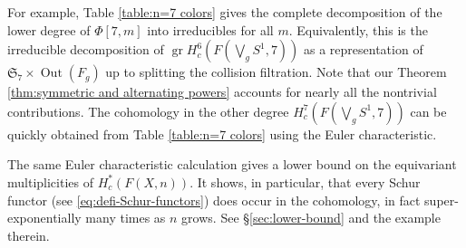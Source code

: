 \documentclass[12pt]{article}
\newcommand{\SymGroup}[1][n]{\mathfrak{S}_{#1}}
\DeclareMathOperator{\GL}{GL}
\DeclareMathOperator{\gr}{gr}
\DeclareMathOperator{\Out}{Out}
\theoremstyle{plain}
\theoremstyle{definition}
\theoremstyle{remark}
\begin{document}
\begin{table}[hbt!]
{\begin{minipage}{\textwidth}
\begin{tabular}
\end{tabular}
    \caption{$(\lambda,\mu)$ multiplicity in $\Phi[7,m]$ in codimension 1, arranged in lex-order of partitions. Unspecified entries are all zero. Yellow and red columns correspond to symmetric and alternating powers, respectively, and are completely described by Theorem \ref{thm:symmetric and alternating powers}. Lilac rows are computed in \cite[Examples 3-4]{PV18}. %
    }
    \label{table:n=7 colors}
    \end{minipage}}
\end{table}
For example, Table \ref{table:n=7 colors} gives the complete decomposition of the lower degree of $\Phi[7,m]$ into irreducibles for all $m$. Equivalently, this is the irreducible decomposition of $\gr H^{6}_c(F(\bigvee_g S^1 ,7))$ as a representation of $\SymGroup[7]\times \Out(F_g)$ up to splitting the collision filtration. Note that our Theorem \ref{thm:symmetric and alternating powers} accounts for nearly all the nontrivial contributions. The cohomology in the other degree $ H^{7}_c(F(\bigvee_g S^1 ,7))$ can be quickly obtained from Table \ref{table:n=7 colors} using the Euler characteristic.

The same Euler characteristic calculation gives a lower bound on the equivariant multiplicities of $H^*_c(F(X,n))$. It shows, in particular, that every Schur functor (see \eqref{eq:defi-Schur-functors}) does occur in the cohomology, in fact super-exponentially many times as $n$ grows. See \S\ref{sec:lower-bound} and the example therein.



\end{document}

